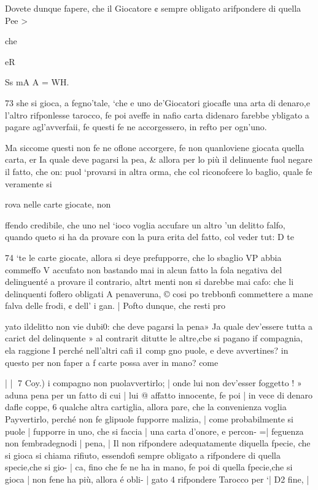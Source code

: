 \documentclass[12pt,a6paper]{article}
\begin{document}
Dovete dunque fapere, che
il Giocatore ¢ sempre obligato
arifpondere di quella Pee >

che

eR

Ss mA A = WH.

 
 

73
she si gioca, a fegno'tale, ‘che
e uno de’Giocatori giocafle una
arta di denaro,e l’altro rifponlesse tarocco, fe poi aveffe in
nafio carta didenaro farebbe
ybligato a pagare agl’avverfaii, fe questi fe ne accorgessero,
in refto per ogn’uno.

Ma siccome questi non fe ne
oflone accorgere, fe non quanloviene giocata quella carta,
er Ia quale deve pagarsi la pea, & allora per lo più il delinuente fuol negare il fatto, che
on: puol ‘provarsi in altra
orma, che col riconofcere lo
baglio, quale fe veramente si

rova nelle carte giocate, non

ffendo credibile, che uno nel
‘ioco voglia accufare un altro
’un delitto falfo, quando queto si ha da provare con la pura
erita del fatto, col veder tut:
D te
 

 

 

 

74
‘te le carte giocate, allora si deye prefupporre, che lo sbaglio
VP abbia commeffo V accufato
non bastando mai in alcun fatto
la fola negativa del delinguenté
a provare il contrario, altrt
menti non si darebbe mai cafo:
che li delinquenti foflero obligati A penaveruna, © cosi po
trebbonfi commettere a mane
falva delle frodi, ¢ dell’ i
gan. |
Pofto dunque, che resti pro

yato ildelitto non vie dubi0:
che deve pagarsi la pena» Ja
quale dev'essere tutta a carict
del delinquente » al contrarit
ditutte le altre,cbe si pagano if
compagnia, ela raggione I
perché nell’altri cafi i1 comp
gno puole, e deve avvertines?
in questo per non faper a f
carte possa aver in mano?
come

 

| |
7
Coy.) i
compagno non puolavvertirlo; |
onde lui non dev’esser foggetto !
» aduna pena per un fatto di cui |
lui @ affatto innocente, fe poi |
in vece di denaro dafle coppe, 6
qualche altra cartiglia, allora
pare, che la convenienza voglia Payvertirlo, perché non
fe glipuole fupporre malizia, |
come probabilmente si puole |
fupporre in uno, che si faccia |
una carta d’onore, e percon- =|
feguenza non fembradegnodi |
pena, |
Il non rifpondere adequatamente diquella fpecie, che si
gioca si chiama rifiuto, essendofi sempre obligato a rifpondere di quella specie,che si gio- |
ca, fino che fe ne ha in mano, fe
poi di quella fpecie,che si gioca |
non fene ha più, allora é obli- |
gato 4 rifpondere Tarocco per ‘|
D2 fine, |
\end{document}
